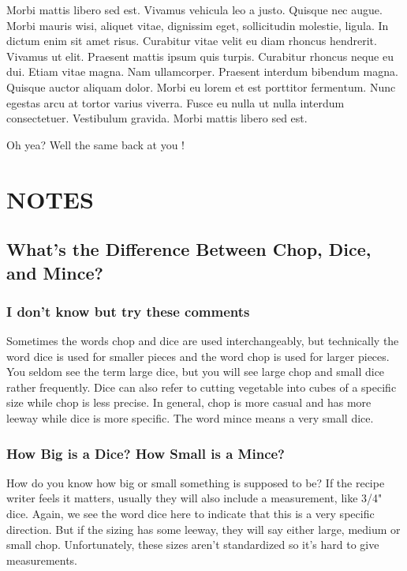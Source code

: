 \documentclass[
]{book}
\begin{document}
Morbi mattis libero sed est. Vivamus vehicula leo a justo. Quisque nec augue. Morbi mauris wisi, aliquet vitae, dignissim eget, sollicitudin molestie, ligula. In dictum enim sit amet risus. Curabitur vitae velit eu diam rhoncus hendrerit. Vivamus ut elit. Praesent mattis ipsum quis turpis. Curabitur rhoncus neque eu dui. Etiam vitae magna. Nam ullamcorper. Praesent interdum bibendum magna. Quisque auctor aliquam dolor. Morbi eu lorem et est porttitor fermentum. Nunc egestas arcu at tortor varius viverra. Fusce eu nulla ut nulla interdum consectetuer. Vestibulum gravida. Morbi mattis libero sed est.

Oh yea? Well the same back at you !

\hypertarget{notes}{%
\chapter{NOTES}\label{notes}}

\hypertarget{notes}{%
\section*{What's the Difference Between Chop, Dice, and Mince?}\label{notes}}


\hypertarget{i-dont-know-but-try-these-comments}{%
\subsection*{I don't know but try these comments}\label{i-dont-know-but-try-these-comments}}


Sometimes the words chop and dice are used interchangeably, but technically the word dice is used for smaller pieces and the word chop is used for larger pieces.
You seldom see the term large dice, but you will see large chop and small dice rather frequently. Dice can also refer to cutting vegetable into cubes of a specific size while chop is less precise. In general, chop is more casual and has more leeway while dice is more specific.
The word mince means a very small dice.

\hypertarget{how-big-is-a-dice-how-small-is-a-mince}{%
\subsection*{How Big is a Dice? How Small is a Mince?}\label{how-big-is-a-dice-how-small-is-a-mince}}


How do you know how big or small something is supposed to be? If the recipe writer feels it matters,
usually they will also include a measurement, like 3/4" dice.
Again, we see the word dice here to indicate that this is a very specific direction.
But if the sizing has some leeway, they will say either large, medium or small chop. Unfortunately,
these sizes aren't standardized so it's hard to give measurements.
\end{document}
